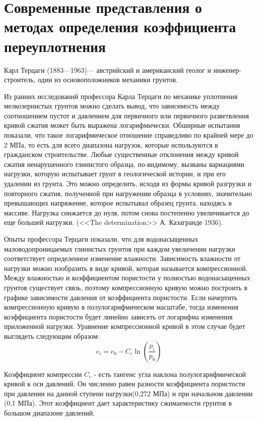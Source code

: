 \chapter{Современные представления о методах определения коэффициента переуплотнения}



Карл Терцаги (1883—1963)— австрийский и американский геолог и инженер-строитель, один из основоположников механики грунтов.

Из ранних исследований профессора Карла Терцаги по механике уплотнения мелкозернистых грунтов можно сделать вывод, что зависимость между соотношением пустот и давлением для первичного или первичного разветвления кривой сжатия может быть выражена логарифмически. Обширные испытания показали, что такое логарифмическое отношение справедливо по крайней мере до 2 МПа, то есть для всего диапазона нагрузок, которые используются в гражданском строительстве. Любые существенные отклонения между кривой сжатия ненарушенного глинистого образца, по-видимому, вызваны вариациями нагрузки, которую испытывает грунт в геологической истории, и при его удалении из грунта. Это можно определить, исходя из формы кривой разгрузки и повторного сжатия, полученной при нагружении образца в условиях, значительно превышающих напряжение, которое испытывал образец грунта, находясь в массиве. Нагрузка снижается до нуля, потом снова постепенно увеличивается до еще большей нагрузки. (<<The determination>> А. Казагранде 1936). \cite{boone_critical_2010}
 
 Опыты профессора Терцаги показали, что для водонасыщенных маловодопроницаемых глинистых грунтов при каждом увеличении нагрузки соответствует определенное изменение влажности. Зависимость влажности от нагрузки можно изобразить в виде кривой, которая называется компрессионной. Между влажностью и коэффициентом пористости у полностью водонасыщенных грунтов существует связь, поэтому компрессионную кривую можно построить в графике зависимости давления от коэффициента пористости. Если начертить компрессионную кривую в полулогарифмическом масштабе, тогда изменения коэффициента пористости будет линейно зависеть от логарифма изменения приложенной нагрузки. Уравнение компрессионной кривой в этом случае будет выглядеть следующим образом:
 $$e_i=e_0-C_c\ln(\frac{p_i}{p_0})$$
 
 
 Коэффициент компрессии $C_c$ - есть тангенс угла наклона полулогарифмической кривой к оси давлений. Он численно равен разности коэффициента пористости при давлении на данной ступени нагрузки(0,272 МПа) и при начальном давлении (0,1 МПа). Этот коэффициент дает характеристику сжимаемости грунтов в большом диапазоне давлений. 
 
